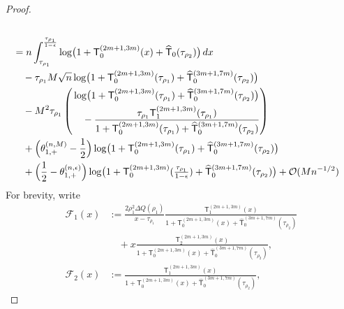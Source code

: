 \documentclass[a4paper]{article}
\numberwithin{equation}{section}
\begin{document}
\begin{proof}
\begin{align*}
\\
&=
n\int_{\tau_{\rho_1}}^{\frac{\tau_{\rho_1}}{1-\epsilon}}
\log\bigl(1+\mathsf{T}_{0}^{(2m+1,3m)}(x)+\widehat{\mathsf{T}}_0(\tau_{\rho_2})\bigr)\,dx
\\
&\quad-\tau_{\rho_1}M\sqrt{n}\log\bigl(1+\mathsf{T}_{0}^{(2m+1,3m)}(\tau_{\rho_1})+\widehat{\mathsf{T}}_0^{(3m+1,7m)}(\tau_{\rho_2})\bigr)
\\
&\quad
-M^2\tau_{\rho_1}
\left(\begin{aligned}&
\log\bigl(1+\mathsf{T}_{0}^{(2m+1,3m)}(\tau_{\rho_1})+\widehat{\mathsf{T}}_0^{(3m+1,7m)}(\tau_{\rho_2})\bigr)
\\
&\quad-\frac{\tau_{\rho_1}\mathsf{T}_{1}^{(2m+1,3m)}(\tau_{\rho_1})}{1+\mathsf{T}_{0}^{(2m+1,3m)}(\tau_{\rho_1})+\widehat{\mathsf{T}}_0^{(3m+1,7m)}(\tau_{\rho_2})}
\end{aligned}\right)
\\
&\quad
+
\Bigl(\theta_{1,+}^{(n,M)}-\frac{1}{2}\Bigr)
\log\bigl(1+\mathsf{T}_{0}^{(2m+1,3m)}(\tau_{\rho_1})+\widehat{\mathsf{T}}_0^{(3m+1,7m)}(\tau_{\rho_2})\bigr)
\\
&\quad
+\Bigl(\frac{1}{2}-\theta_{1,+}^{(n,\epsilon)}\Bigr)\log\bigl(1+\mathsf{T}_{0}^{(2m+1,3m)}(\tfrac{\tau_{\rho_1}}{1-\epsilon})+\widehat{\mathsf{T}}_0^{(3m+1,7m)}(\tau_{\rho_2})\bigr)
+
\mathcal{O}(Mn^{-1/2})
\end{align*}
For brevity, write
\begin{align*}
\mathscr{F}_1(x)&:=
\frac{2\rho_1^2\Delta Q(\rho_1)}{x-\tau_{\rho_1}}
\frac{\mathsf{T}_{1}^{(2m+1,3m)}(x)}{1+\mathsf{T}_{0}^{(2m+1,3m)}(x)+\widehat{\mathsf{T}}_{0}^{(3m+1,7m)}(\tau_{\rho_2})}
\\
&\quad+
x\frac{\mathsf{T}_{2}^{(2m+1,3m)}(x)}{1+\mathsf{T}_{0}^{(2m+1,3m)}(x)+\widehat{\mathsf{T}}_{0}^{(3m+1,7m)}(\tau_{\rho_2})}, 
\\
\mathscr{F}_2(x)&:=
\frac{\mathsf{T}_{1}^{(2m+1,3m)}(x)}{1+\mathsf{T}_{0}^{(2m+1,3m)}(x)+\widehat{\mathsf{T}}_{0}^{(3m+1,7m)}(\tau_{\rho_2})}, 

\end{align*}
\end{proof}
\end{document}

